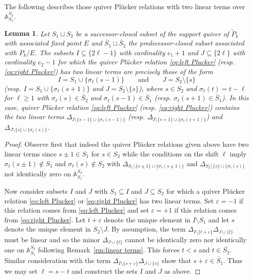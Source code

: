 \documentclass{amsart}
\newtheorem{lemma}[theorem]{Lemma}
\numberwithin{equation}{section}
\renewcommand{\AA}{\mathbb{A}}
\begin{document}
  The following describes those quiver Pl\"ucker relations with two linear terms over $\AA_{S_1}^{S_2}$.
  \begin{lemma}
    Let $S_1\sqcup S_2$ be a successor-closed subset of the support quiver of $\tilde P_k$ with associated fixed point $E$ and $\bar{S}_1\sqcup\bar{S}_2$ the predecessor-closed subset associated with $P_k/E$.
    The subsets $I\subseteq\{2\ell-1\}$ with cardinality $e_1+1$ and $J\subseteq\{2\ell\}$ with cardinality $e_2-1$ for which the quiver Pl\"ucker relation \eqref{eq:left Plucker} (resp. \eqref{eq:right Plucker}) has two linear terms are precisely those of the form
    \[I=S_1\cup\{\sigma_\ell(s-1)\} \qquad \text{and} \qquad J=S_2\setminus\{s\}\]
    (resp. $I=S_1\cup\{\sigma_\ell(s+1)\}$ and $J=S_2\setminus\{s\}$), where $s\in S_2$ and $\sigma_\ell(t)=t-\ell$ for $\ell\ge1$ with $\sigma_\ell(s)\in\bar{S}_2$ and $\sigma_\ell(s-1)\in\bar{S}_1$ (resp. $\sigma_\ell(s+1)\in\bar{S}_1$).
    In this case, quiver Pl\"ucker relation \eqref{eq:left Plucker} (resp. \eqref{eq:right Plucker}) contains the two linear terms $\Delta_{I\setminus\{s-1\}\cup\{\sigma_\ell(s-1)\}}$ (resp. $\Delta_{I\setminus\{s+1\}\cup\{\sigma_\ell(s+1)\}}$) and $\Delta_{J\setminus\{s\}\cup\{\sigma_\ell(s)\}}$.
  \end{lemma}
  \begin{proof}
    Observe first that indeed the quiver Pl\"ucker relations given above have two linear terms since $s\pm1\in S_1$ for $s\in S_2$ while the conditions on the shift $\ell$ imply $\sigma_\ell(s\pm1)\notin S_1$ and $\sigma_\ell(s)\notin S_2$ with $\Delta_{S_1\setminus\{s\pm1\}\cup\{\sigma_\ell(s\pm1)\}}$ and $\Delta_{S_2\setminus\{s\}\cup\{\sigma_\ell(s)\}}$ not identically zero on $\AA_{S_1}^{S_2}$.

    Now consider subsets $I$ and $J$ with $S_1\subseteq I$ and $J\subseteq S_2$ for which a quiver Pl\"ucker relation \eqref{eq:left Plucker} or \eqref{eq:right Plucker} has two linear terms.
    Set $\varepsilon=-1$ if this relation comes from \eqref{eq:left Plucker} and set $\varepsilon=+1$ if this relation comes from \eqref{eq:right Plucker}.
    Let $t+\varepsilon$ denote the unique element in $I\setminus S_1$ and let $s$ denote the unique element in $S_2\setminus J$.
    By assumption, the term $\Delta_{I\setminus\{t+\varepsilon\}} \Delta_{J\cup\{t\}}$ must be linear and so the minor $\Delta_{J\cup\{t\}}$ cannot be identically zero nor identically one on $\AA_{S_1}^{S_2}$ following Remark~\ref{rm:linear terms}.
    This forces $t<s$ and $t\in\bar{S_2}$.
    Similar consideration with the term $\Delta_{I\setminus\{s+\varepsilon\}} \Delta_{J\cup\{s\}}$ show that $s+\varepsilon\in\bar{S}_1$.
    Thus we may set $\ell=s-t$ and construct the sets $I$ and $J$ as above.
  \end{proof}
\end{document}
